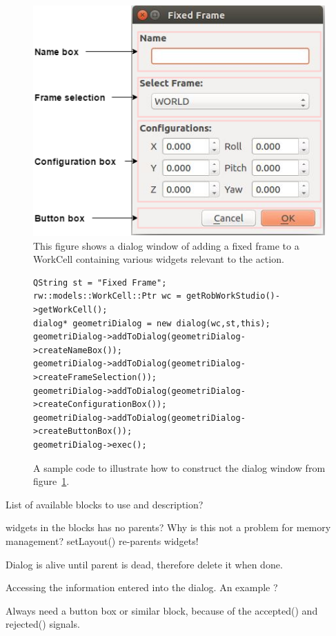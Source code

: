 \begin{figure}[h]
	\centering
	\includegraphics[scale=0.55]{Figures/dialogclassblocks.png}
	\caption{This figure shows a dialog window of adding a fixed frame to a WorkCell containing various widgets relevant to the action. }
	\label{fig:dialogclassblocks}
\end{figure}

\begin{figure}[h]
\centering
\lstset{language=C++} 
\begin{lstlisting}[frame=single]  
QString st = "Fixed Frame";
rw::models::WorkCell::Ptr wc = getRobWorkStudio()->getWorkCell();
dialog* geometriDialog = new dialog(wc,st,this);
geometriDialog->addToDialog(geometriDialog->createNameBox());
geometriDialog->addToDialog(geometriDialog->createFrameSelection());
geometriDialog->addToDialog(geometriDialog->createConfigurationBox());
geometriDialog->addToDialog(geometriDialog->createButtonBox());	
geometriDialog->exec();	 
\end{lstlisting}
\caption{A sample code to illustrate how to construct the dialog window from figure~\ref{fig:dialogclassblocks}.}
\label{fig:dialogWindowCode} 	
\end{figure}


List of available blocks to use and description?

widgets in the blocks has no parents? Why is this not a problem for memory management? setLayout() re-parents widgets!

Dialog is alive until parent is dead, therefore delete it when done.

Accessing the information entered into the dialog. An example ?

Always need a button box or similar block, because of the accepted() and rejected() signals.




